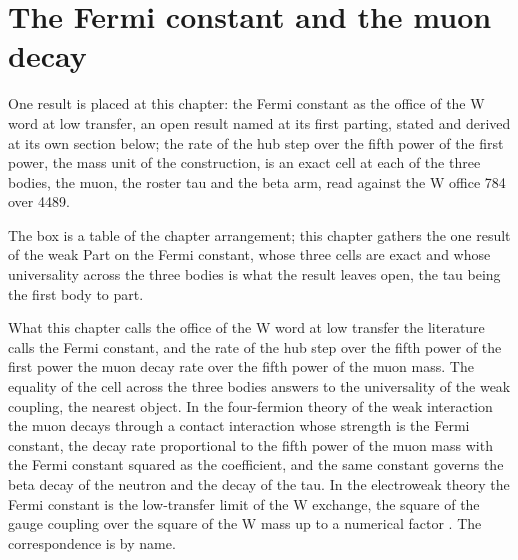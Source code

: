 \section{The Fermi constant and the muon decay}\label{mod:VI-5-fermi-constant-and-the-muon-decay}
\begin{chtable}
One result is placed at this chapter: the Fermi constant as the office of the W word at low transfer, an open result named at its first parting, stated and derived at its own section below; the rate of the hub step over the fifth power of the first power, the mass unit of the construction, is an exact cell at each of the three bodies, the muon, the roster tau and the beta arm, read against the W office 784 over 4489.
\end{chtable}
\chdeps{}{}
The box is a table of the chapter arrangement; this chapter gathers the one result of the weak Part on the Fermi constant, whose three cells are exact and whose universality across the three bodies is what the result leaves open, the tau being the first body to part.
\begin{chbridge}
What this chapter calls the office of the W word at low transfer the literature calls the Fermi constant, and the rate of the hub step over the fifth power of the first power the muon decay rate over the fifth power of the muon mass. The equality of the cell across the three bodies answers to the universality of the weak coupling, the nearest object. In the four-fermion theory of the weak interaction the muon decays through a contact interaction whose strength is the Fermi constant, the decay rate proportional to the fifth power of the muon mass with the Fermi constant squared as the coefficient, and the same constant governs the beta decay of the neutron and the decay of the tau. In the electroweak theory the Fermi constant is the low-transfer limit of the W exchange, the square of the gauge coupling over the square of the W mass up to a numerical factor \cite{Fermi1934,Michel1950,Weinberg1967}. The correspondence is by name.
\end{chbridge}
